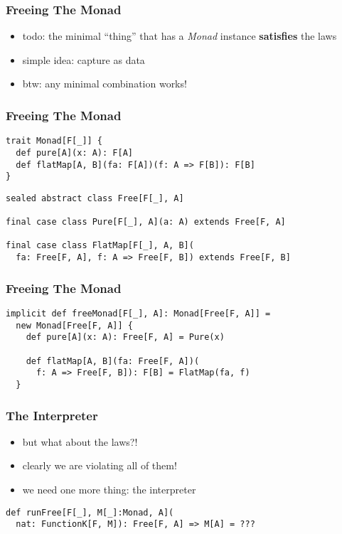 \documentclass{beamer}
\begin{document}
\begin{frame}[fragile]
  \frametitle{Freeing The Monad}
  \begin{itemize}
  \item todo: the minimal ``thing'' that has a \textit{Monad} instance
    \textbf{satisfies} the laws
  \item simple idea: capture as data
  \item btw: any minimal combination works!
  \end{itemize}
\end{frame}

\begin{frame}[fragile]
  \frametitle{Freeing The Monad}
    \begin{center}
\begin{verbatim}
trait Monad[F[_]] {
  def pure[A](x: A): F[A]
  def flatMap[A, B](fa: F[A])(f: A => F[B]): F[B]
}
\end{verbatim}
\vspace{1cm}
\begin{verbatim}
sealed abstract class Free[F[_], A]

final case class Pure[F[_], A](a: A) extends Free[F, A]

final case class FlatMap[F[_], A, B](
  fa: Free[F, A], f: A => Free[F, B]) extends Free[F, B]
  \end{verbatim}
\end{center}
\end{frame}

\begin{frame}[fragile]
  \frametitle{Freeing The Monad}
    \begin{center}
\begin{verbatim}
implicit def freeMonad[F[_], A]: Monad[Free[F, A]] =
  new Monad[Free[F, A]] {
    def pure[A](x: A): Free[F, A] = Pure(x)

    def flatMap[A, B](fa: Free[F, A])(
      f: A => Free[F, B]): F[B] = FlatMap(fa, f)
  }
\end{verbatim}
\end{center}
\end{frame}

\begin{frame}[fragile]
  \frametitle{The Interpreter}
  \begin{itemize}
  \item but what about the laws?!
  \item clearly we are violating all of them!
  \item we need one more thing: the interpreter
  \end{itemize}
  \begin{verbatim}
def runFree[F[_], M[_]:Monad, A](
  nat: FunctionK[F, M]): Free[F, A] => M[A] = ???
  \end{verbatim}
\end{frame}
\end{document}
